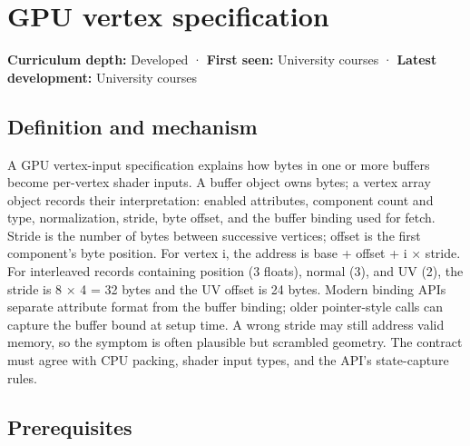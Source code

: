 \hypertarget{appendix-749ba51a6c25}{}\label{referencestart:appendix-749ba51a6c25}
\section{GPU vertex specification}\label{appendix-749ba51a6c25-gpu-vertex-specification}

\hypertarget{appendix-749ba51a6c25-gpu-vertex-specification}{}

\textbf{Curriculum depth:} Developed · \textbf{First seen:} University courses · \textbf{Latest development:} University courses

\begin{allmightroledefinition}

\subsection{Definition and mechanism}\label{appendix-749ba51a6c25-definition-and-mechanism}

\hypertarget{appendix-749ba51a6c25-definition-and-mechanism}{}

A GPU vertex-input specification explains how bytes in one or more buffers become per-vertex shader inputs. A buffer object owns bytes; a vertex array object records their interpretation: enabled attributes, component count and type, normalization, stride, byte offset, and the buffer binding used for fetch. Stride is the number of bytes between successive vertices; offset is the first component's byte position. For vertex i, the address is base + offset + i × stride. For interleaved records containing position (3 floats), normal (3), and UV (2), the stride is 8 × 4 = 32 bytes and the UV offset is 24 bytes. Modern binding APIs separate attribute format from the buffer binding; older pointer-style calls can capture the buffer bound at setup time. A wrong stride may still address valid memory, so the symptom is often plausible but scrambled geometry. The contract must agree with CPU packing, shader input types, and the API's state-capture rules.

\end{allmightroledefinition}

\subsection{Prerequisites}\label{appendix-749ba51a6c25-prerequisites}

\hypertarget{appendix-749ba51a6c25-prerequisites}{}


